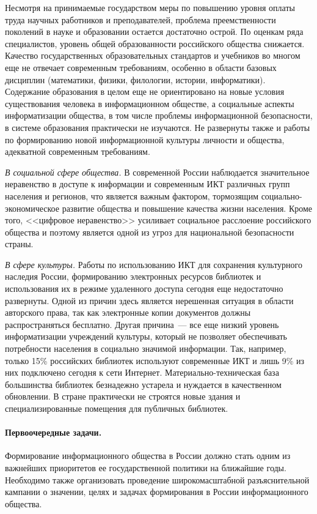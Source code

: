 \begin{multicols}{2}
   Несмотря на принимаемые государством меры по повышению уровня оплаты труда
научных работников и преподавателей, проблема преемственности поколений в науке и
образовании остается достаточно острой. По оценкам ряда специалистов, уровень общей
образованности российского общества снижается. Качество государственных
образовательных стандартов и учебников во многом еще не отвечает современным
требованиям, особенно в области базовых дисциплин (математики, физики, филологии,
истории, информатики). Содержание образования в целом еще не ориентировано на новые
условия существования человека в информационном обществе, а социальные аспекты
информатизации общества, в том числе проблемы информационной безопасности, в
системе образования практически не изучаются. Не развернуты также и работы по
формированию новой информационной культуры личности и общества, адекватной
современным требованиям.

   \vspace*{1pt}
   \textit{В социальной сфере общества.} В современной России наблюдается
значительное неравенство в доступе к информации и современным ИКТ различных групп
населения и регионов, что является важным фактором, тормозящим 
социально-эко\-но\-ми\-че\-ское развитие общества и повышение качества жизни населения. Кроме того,
<<цифровое неравенство>> усиливает социальное расслоение российского общества и
поэтому является одной из угроз для национальной безопасности страны.

   \vspace*{1pt}
     \textit{В сфере культуры.} Работы по использованию ИКТ для сохранения
культурного наследия России, формированию электронных ресурсов библиотек и
использования их в режиме удаленного доступа сегодня еще недостаточно развернуты.
Одной из причин здесь является нерешенная ситуация в об\-ласти авторского права, так как
электронные копии документов должны распространяться бесплатно. Другая причина~---
все еще низкий уровень информатизации учреждений культуры, который не позволяет
обеспечивать потребности населения в социально значимой информации. Так, например,
только 15\% российских библиотек используют современные ИКТ и лишь 9\% из них
подключено сегодня к сети Интернет. Материально-техническая база большинства
библиотек безнадежно устарела и нуждается в качественном обновлении. В стране
практически не строятся новые здания и специализированные помещения для публичных
библиотек.

\vspace*{-12pt}
\paragraph*{Первоочередные задачи.} Формирование информационного общества в
России должно стать одним из важнейших приоритетов ее государственной политики на
ближайшие годы. Необходимо также организовать проведение широкомасштабной
разъяснительной кампании о значении, целях и задачах формирования в России
информационного общества.


\end{multicols}
